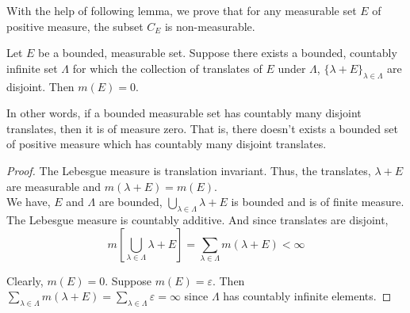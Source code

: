 	With the help of following lemma, we prove that for any measurable set $E$ of positive measure, the subset $C_E$ is non-measurable.

\begin{lemma}
	Let $E$ be a bounded, measurable set.
	Suppose there exists a bounded, countably infinite set $\Lambda$ for which the collection of translates of $E$ under $\Lambda$, $\{ \lambda + E \}_{\lambda \in \Lambda}$ are disjoint.
	Then $m(E) = 0$.
\end{lemma}
In other words, if a bounded measurable set has countably many disjoint translates, then it is of measure zero.
That is, there doesn't exists a bounded set of positive measure which has countably many disjoint translates.
\begin{proof}
	The Lebesgue measure is translation invariant.
	Thus, the translates, $\lambda + E$ are measurable and $m(\lambda + E) = m(E)$.\\

	We have, $E$ and $\Lambda$ are bounded, $\displaystyle \bigcup_{\lambda \in \Lambda}\lambda + E$ is bounded and is of finite measure.
	The Lebesgue measure is countably additive.
	And since translates are disjoint,
\begin{equation*}
	m \left[ \bigcup_{\lambda \in \Lambda} \lambda + E \right] = \sum_{\lambda \in \Lambda} m(\lambda+E) < \infty
\end{equation*}

	Clearly, $m(E) = 0$.
	Suppose $m(E) = \varepsilon$.
	Then $\displaystyle \sum_{\lambda \in \Lambda} m(\lambda + E) = \sum_{\lambda \in \Lambda} \varepsilon = \infty$ since $\Lambda$ has countably infinite elements.
\end{proof}

